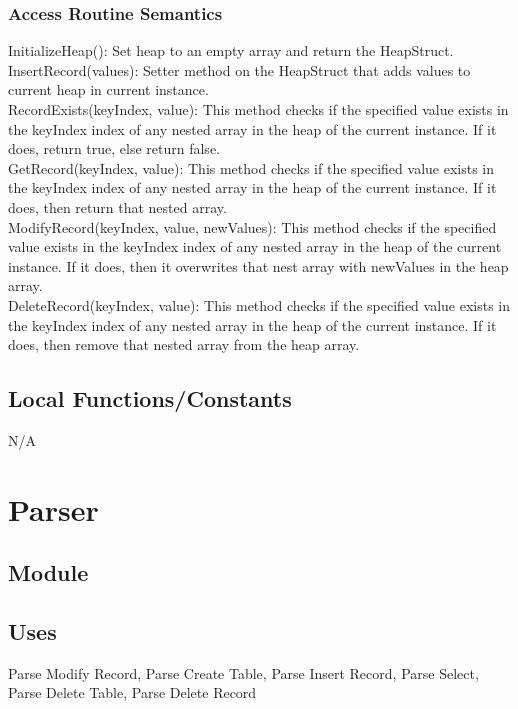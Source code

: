 \documentclass[12pt]{article}
\begin{document}
\subsubsection{Access Routine Semantics}
\noindent InitializeHeap(): Set heap to an empty array and return the HeapStruct.\\

\noindent InsertRecord(values): Setter method on the HeapStruct that adds values to current heap in current instance. \\

\noindent RecordExists(keyIndex, value): This method checks if the specified value exists in the keyIndex index of any nested array in the heap of the current instance. If it does, return true, else return false.\\

\noindent GetRecord(keyIndex, value): This method checks if the specified value exists in the keyIndex index of any nested array in the heap of the current instance. If it does, then return that nested array.\\

\noindent ModifyRecord(keyIndex, value, newValues): This method checks if the specified value exists in the keyIndex index of any nested array in the heap of the current instance. If it does, then it overwrites that nest array with newValues in the heap array.\\

\noindent DeleteRecord(keyIndex, value): This method checks if the specified value exists in the keyIndex index of any nested array in the heap of the current instance. If it does, then remove that nested array from the heap array.\\

\subsection{Local Functions/Constants}
N/A

\newpage

\section {Parser}

\subsection{Module}

\subsection {Uses}
Parse Modify Record, Parse Create Table, Parse Insert Record, Parse Select, Parse Delete Table, Parse Delete Record
\end{document}
